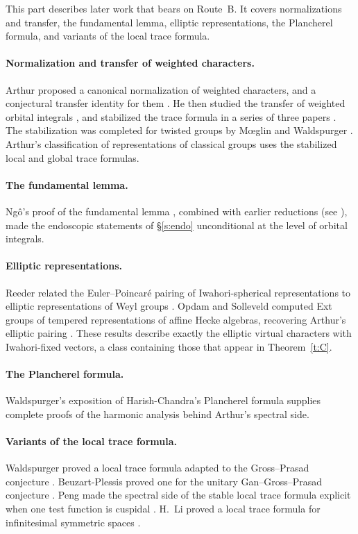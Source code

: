 \documentclass[12pt,letterpaper]{article}
\numberwithin{equation}{section}
\theoremstyle{plain}
\theoremstyle{definition}
\theoremstyle{remark}
\begin{document}
This part describes later work that bears on Route~B. It covers normalizations and transfer, the fundamental lemma, elliptic representations, the Plancherel formula, and variants of the local trace formula.

\paragraph{Normalization and transfer of weighted characters.} Arthur proposed a canonical normalization of weighted characters, and a conjectural transfer identity for them \cite{Ar98}. He then studied the transfer of weighted orbital integrals \cite{Ar99}, and stabilized the trace formula in a series of three papers \cite{Ar02,Ar01,Ar03}. The stabilization was completed for twisted groups by M\oe glin and Waldspurger \cite{MW16}. Arthur's classification of representations of classical groups \cite{Ar13} uses the stabilized local and global trace formulas.

\paragraph{The fundamental lemma.} Ng\^o's proof of the fundamental lemma \cite{Ng10}, combined with earlier reductions (see \cite[Literature review]{JC26}), made the endoscopic statements of \S\ref{s:endo} unconditional at the level of orbital integrals.

\paragraph{Elliptic representations.} Reeder related the Euler--Poincar\'e pairing of Iwahori-spherical representations to elliptic representations of Weyl groups \cite{Re01}. Opdam and Solleveld computed Ext groups of tempered representations of affine Hecke algebras, recovering Arthur's elliptic pairing \cite{OS13}. These results describe exactly the elliptic virtual characters with Iwahori-fixed vectors, a class containing those that appear in Theorem~\ref{t:C}.

\paragraph{The Plancherel formula.} Waldspurger's exposition of Harish-Chandra's Plancherel formula \cite{Wa03} supplies complete proofs of the harmonic analysis behind Arthur's spectral side.

\paragraph{Variants of the local trace formula.} Waldspurger proved a local trace formula adapted to the Gross--Prasad conjecture \cite{Wa10}. Beuzart-Plessis proved one for the unitary Gan--Gross--Prasad conjecture \cite{BP20}. Peng made the spectral side of the stable local trace formula explicit when one test function is cuspidal \cite{Pe16}. H.~Li proved a local trace formula for infinitesimal symmetric spaces \cite{Li21}.
\end{document}
